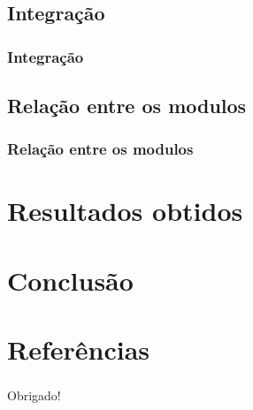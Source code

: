 \documentclass{beamer}
\begin{document}
    \subsection{Integração}
		\begin{frame}
	    	\frametitle{Integração}
	    	
	    \end{frame}
    
    \subsection{Relação entre os modulos}
		\begin{frame}
	    	\frametitle{Relação entre os modulos}
	    	
	    \end{frame}

\section{Resultados obtidos}

\section{Conclusão}

\nocite{fabriciobuzzeto,weiser2,saocarlos,yang,hewitt,violajones}

\section{Referências}


\begin{frame}
    \frametitle{ }
    \centerline{Obrigado!}
\end{frame}
\end{document}
